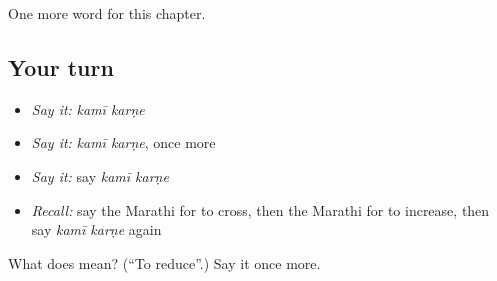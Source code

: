 \begin{grammarlens}[title={What you've built}]
One more word for this chapter.
\end{grammarlens}

\subsection*{Your turn}
\begin{itemize}
\raggedright
  \item \emph{Say it:} \emph{kamī karṇe}
  \item \emph{Say it:} \emph{kamī karṇe}, once more
  \item \emph{Say it:} say \emph{kamī karṇe}
  \item \emph{Recall:} say the Marathi for to cross, then the Marathi for to increase, then say \emph{kamī karṇe} again
\end{itemize}

\begin{tcolorbox}[breakable,colback=teal!4,colframe=teal!35!black,title={Before you move on}]
What does   mean? (\textquotedblleft{}To reduce\textquotedblright{}.) Say it once more.
\end{tcolorbox}
